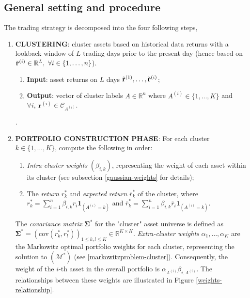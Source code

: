 \documentclass[sigconf]{acmart}
\begin{document}
\subsection{General setting and procedure}
\label{general-setting-strat}
The trading strategy is decomposed into the four following steps,

\begin{enumerate}
    \item[(i)] \textbf{CLUSTERING}: 
    cluster assets based on historical data returns with a lookback window of $L$ trading days prior to the present day (hence based on $\Tilde{\mathbf{r}}^{(i)} \in \mathbb{R}^L, ~ \forall i \in \{1, \hdots, n\}$).
    \begin{enumerate}
        \item[$\bullet$] \textbf{Input}: asset returns  on $L$ days $\Tilde{\mathbf{r}}^{(1)}, \hdots, \Tilde{\mathbf{r}}^{(i)}$;
        \item[$\bullet$] \textbf{Output}: vector of cluster labels $A \in \mathbb{R}^{n}$ where $A^{(i)} \in \{1, \hdots, K\}$ and $\forall i, ~ \mathbf{r}^{(i)} \in \mathcal{C}_{A^{(i)}}$.
    \end{enumerate}
.
    \item[(ii)] \textbf{PORTFOLIO CONSTRUCTION PHASE}: For each cluster $k \in \{1, \ldots, K\}$, compute the following in order:
    \begin{enumerate}
        \item[(a)] \textit{Intra-cluster weights} \((\beta_{i,k})\), representing the weight of each asset within its cluster (see subsection \eqref{gaussian-weights} for details);
        \item[(b)] The \textit{return} \(r^*_k\) and \textit{expected return} \(\bar{r}^*_k\) of the cluster, where \(r^*_k = \sum_{i=1}^n \beta_{i,k} r_i \mathbf{1}_{(A^{(i)}=k)}\) and \(\bar{r}^*_k = \sum_{i=1}^n \beta_{i,k} \bar{r}_i \mathbf{1}_{(A^{(i)}=k)}\).
    \end{enumerate}

    The \textit{covariance matrix} $\boldsymbol{\Sigma}^*$ for the "cluster" asset universe is defined as $\boldsymbol{\Sigma}^* = (\text{cov}(r^*_k, r^*_l))_{1 \leq k,l \leq K} \in \mathbb{R}^{K \times K}$. \textit{Extra-cluster weights} \(\alpha_1, \ldots, \alpha_K\) are the Markowitz optimal portfolio weights for each cluster, representing the solution to \((\boldsymbol{\mathcal{M}}^*)\) (see \ref{markowitzproblem-cluster}). Consequently, the weight of the \(i\)-th asset in the overall portfolio is \(\alpha_{A^{(i)}} \beta_{i, A^{(i)}}\). The relationships between these weights are illustrated in Figure \ref{weights-relationship}.


\end{enumerate}
\end{document}
